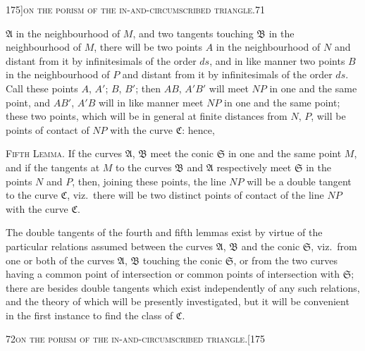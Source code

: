 \documentclass[11pt]{article}
\begin{document}
\begin{center}
\small 175]\hfill\textsc{on the porism of the in-and-circumscribed triangle.}\hfill\textsc{71}
\end{center}

\medskip

\noindent $\mathfrak{A}$ in the neighbourhood of $M$, and two tangents touching $\mathfrak{B}$ in the neighbourhood of
$M$, there will be two points $A$ in the neighbourhood of $N$ and distant from it by
infinitesimals of the order $ds$, and in like manner two points $B$ in the neighbourhood
of $P$ and distant from it by infinitesimals of the order $ds$. Call these points $A$, $A'$;
$B$, $B'$; then $AB$, $A'B'$ will meet $NP$ in one and the same point, and $AB'$, $A'B$
will in like manner meet $NP$ in one and the same point; these two points, which
will be in general at finite distances from $N$, $P$, will be points of contact of $NP$
with the curve $\mathfrak{C}$: hence,

\textsc{Fifth Lemma.} If the curves $\mathfrak{A}$, $\mathfrak{B}$ meet the conic $\mathfrak{S}$ in one and the same
point $M$, and if the tangents at $M$ to the curves $\mathfrak{B}$ and $\mathfrak{A}$ respectively meet $\mathfrak{S}$ in
the points $N$ and $P$, then, joining these points, the line $NP$ will be a double
tangent to the curve $\mathfrak{C}$, viz.\ there will be two distinct points of contact of the line
$NP$ with the curve $\mathfrak{C}$.

The double tangents of the fourth and fifth lemmas exist by virtue of the par\-ticular relations assumed between the curves $\mathfrak{A}$, $\mathfrak{B}$ and the conic $\mathfrak{S}$, viz.\ from one
or both of the curves $\mathfrak{A}$, $\mathfrak{B}$ touching the conic $\mathfrak{S}$, or from the two curves having
a common point of intersection or common points of intersection with $\mathfrak{S}$; there are
besides double tangents which exist independently of any such relations, and the theory
of which will be presently investigated, but it will be convenient in the first instance
to find the class of $\mathfrak{C}$.

\newpage

\begin{center}
\small\textsc{72}\hfill\textsc{on the porism of the in-and-circumscribed triangle.}\hfill[175
\end{center}
\end{document}
